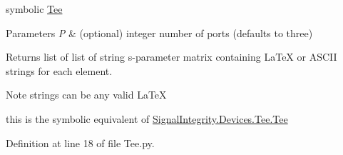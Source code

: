 symbolic \hyperlink{namespaceSignalIntegrity_1_1Symbolic_1_1Tee}{Tee} 


\begin{DoxyParams}{Parameters}
{\em P} & (optional) integer number of ports (defaults to three)~\newline
 \\
\hline
\end{DoxyParams}
\begin{DoxyReturn}{Returns}
list of list of string s-\/parameter matrix containing La\+TeX or A\+S\+C\+II strings for each element. 
\end{DoxyReturn}
\begin{DoxyNote}{Note}
strings can be any valid La\+TeX 

this is the symbolic equivalent of \hyperlink{namespaceSignalIntegrity_1_1Devices_1_1Tee_af0de7f5a03d1e4f045f05d58d151f60a}{Signal\+Integrity.\+Devices.\+Tee.\+Tee} 
\end{DoxyNote}


Definition at line 18 of file Tee.\+py.

